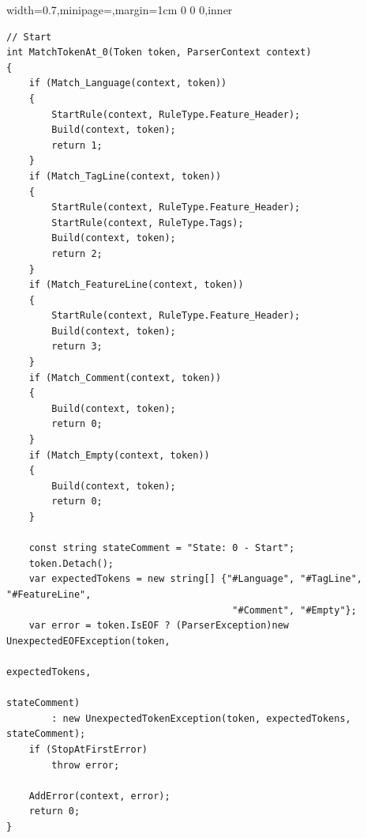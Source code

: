 \documentclass[dissertation,final]{softeng}
\newenvironment{featurecode}[1]
{ \lrbox\featurebox \begin{adjustbox}{width=#1\textwidth,minipage=\textwidth,margin=1cm 0 0 0,inner} }
{ \end{adjustbox}\endlrbox}
\newenvironment{featurelist}[2]
{
\newcommand{\setcaption}{\caption{#1}}
\newcommand{\setlabel}{\label{#2}}
}
{\begin{listing}[h!]\centering\usebox\featurebox\setcaption\setlabel\end{listing}}
\begin{document}
\begin{featurelist}{Parser execution -- Token Matching }{lst:gherkin_code_parser_execution_token_matching}
\begin{featurecode}{0.7}
\begin{verbatim}
// Start
int MatchTokenAt_0(Token token, ParserContext context)
{
    if (Match_Language(context, token))
    {
        StartRule(context, RuleType.Feature_Header);
        Build(context, token);
        return 1;
    }
    if (Match_TagLine(context, token))
    {
        StartRule(context, RuleType.Feature_Header);
        StartRule(context, RuleType.Tags);
        Build(context, token);
        return 2;
    }
    if (Match_FeatureLine(context, token))
    {
        StartRule(context, RuleType.Feature_Header);
        Build(context, token);
        return 3;
    }
    if (Match_Comment(context, token))
    {
        Build(context, token);
        return 0;
    }
    if (Match_Empty(context, token))
    {
        Build(context, token);
        return 0;
    }
    
    const string stateComment = "State: 0 - Start";
    token.Detach();
    var expectedTokens = new string[] {"#Language", "#TagLine", "#FeatureLine",
                                        "#Comment", "#Empty"};
    var error = token.IsEOF ? (ParserException)new UnexpectedEOFException(token,
                                                                          expectedTokens,
                                                                          stateComment) 
        : new UnexpectedTokenException(token, expectedTokens, stateComment);
    if (StopAtFirstError)
        throw error;
    
    AddError(context, error);
    return 0;
}
\end{verbatim}
\end{featurecode}
\end{featurelist}
\clearpage
\end{document}
